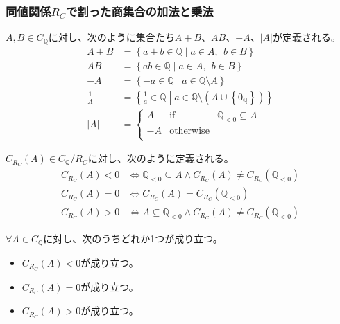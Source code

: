 \documentclass[dvipdfmx]{jsarticle}
\begin{document}
\subsubsection{同値関係$R_{C}$で割った商集合の加法と乗法}%
\begin{dfn}
$A,B \in C_{\mathbb{Q}}$に対し、次のように集合たち$A + B$、$AB$、$- A$、$|A|$が定義される。
\begin{align*}
A + B &= \left\{ a + b \in \mathbb{Q} \middle| a \in A,\ \ b \in B \right\}\\
AB &= \left\{ ab \in \mathbb{Q} \middle| a \in A,\ \ b \in B \right\}\\
- A &= \left\{ - a \in \mathbb{Q} \middle| a \in \mathbb{Q} \setminus A \right\}\\
\frac{1}{A} &= \left\{ \frac{1}{a} \in \mathbb{Q} \middle| a \in \mathbb{Q} \setminus \left( A \cup \left\{ 0_{\mathbb{Q}} \right\} \right) \right\}\\
|A| &= \left\{ \begin{matrix}
A & \mathrm{if} & \mathbb{Q}_{< 0} \subseteq A \\
 - A & \mathrm{otherwise} & \  \\
\end{matrix} \right.\ 
\end{align*}
\end{dfn}
\begin{dfn}
$C_{R_{C}}(A) \in C_{\mathbb{Q}} /R_{C} $に対し、次のように定義される。
\begin{align*}
C_{R_{C}}(A) < 0 &\Leftrightarrow \mathbb{Q}_{< 0} \subseteq A \land C_{R_{C}}(A) \neq C_{R_{C}}\left( \mathbb{Q}_{< 0} \right)\\
C_{R_{C}}(A) = 0 &\Leftrightarrow C_{R_{C}}(A) = C_{R_{C}}\left( \mathbb{Q}_{< 0} \right)\\
C_{R_{C}}(A) > 0 &\Leftrightarrow A \subseteq \mathbb{Q}_{< 0} \land C_{R_{C}}(A) \neq C_{R_{C}}\left( \mathbb{Q}_{< 0} \right)
\end{align*}
\end{dfn}
\begin{thm}\label{1.2.6.29}
$\forall A \in C_{\mathbb{Q}}$に対し、次のうちどれか1つが成り立つ。
\begin{itemize}
\item
  $C_{R_{C}}(A) < 0$が成り立つ。
\item
  $C_{R_{C}}(A) = 0$が成り立つ。
\item
  $C_{R_{C}}(A) > 0$が成り立つ。
\end{itemize}
\end{thm}
\end{document}

